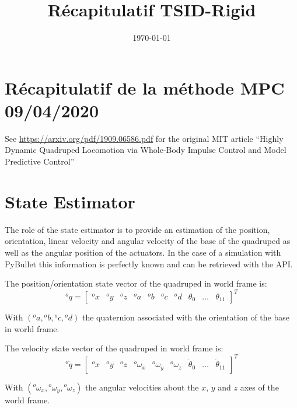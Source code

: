 \documentclass[a4paper,11pt]{article}
\title{Récapitulatif TSID-Rigid}
\author{}
\date{\today}
\newcommand{\PRLsep}{\noindent\makebox[\linewidth]{\resizebox{0.3333\linewidth}{1pt}{$\bullet$}}}%
\begin{document}

\section*{Récapitulatif de la méthode MPC 09/04/2020}

\vspace{0.8cm}
\PRLsep
\vspace{0.5cm}

See \url{https://arxiv.org/pdf/1909.06586.pdf} for the original MIT article ``Highly Dynamic Quadruped Locomotion via Whole-Body Impulse Control and Model Predictive Control''

\section{State Estimator}

The role of the state estimator is to provide an estimation of the position, orientation, linear velocity and angular velocity of the base of the quadruped as well as the angular position of the actuators. In the case of a simulation with PyBullet this information is perfectly known and can be retrieved with the API.

The position/orientation state vector of the quadruped in world frame is:
\begin{equation}
{}^o\!q = \begin{bmatrix} {}^o\!x & {}^o\!y & {}^o\!z & {}^o\!a & {}^o\!b & {}^o\!c & {}^o\!d & \theta_0 & \dots & \theta_{11} \end{bmatrix}^T
\end{equation}

With $({}^o\!a,{}^o\!b,{}^o\!c,{}^o\!d)$ the quaternion associated with the orientation of the base in world frame.

The velocity state vector of the quadruped in world frame is:
\begin{equation}
{}^o\!\dot q = \begin{bmatrix} {}^o\!\dot x & {}^o\!\dot y & {}^o\!\dot z & {}^o\!\omega_x & {}^o\!\omega_y & {}^o\!\omega_z & \dot \theta_0 & \dots & \dot \theta_{11} \end{bmatrix}^T
\end{equation}

With $({}^o\!\omega_x, {}^o\!\omega_y, {}^o\!\omega_z)$ the angular velocities about the $x$, $y$ and $z$ axes of the world frame.
\end{document}
